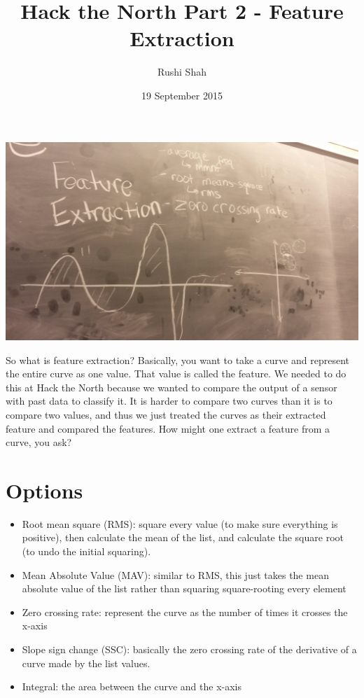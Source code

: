 \documentclass[12pt]{article}
\title{Hack the North Part 2 - Feature Extraction}
\author{Rushi Shah}
\date{19 September 2015}
\begin{document}
  \maketitle

\begin{center}
\includegraphics[width=6in]{feature-vectors}
\end{center}

So what is feature extraction? Basically, you want to take a curve and
represent the entire curve as one value. That value is called the
feature. We needed to do this at Hack the North because we wanted to
compare the output of a sensor with past data to classify it. It is
harder to compare two curves than it is to compare two values, and thus
we just treated the curves as their extracted feature and compared the
features. How might one extract a feature from a curve, you ask?

\section{Options}\label{options}

\begin{itemize}
\item
  Root mean square (RMS): square every value (to make sure everything is
  positive), then calculate the mean of the list, and calculate the
  square root (to undo the initial squaring).
\item
  Mean Absolute Value (MAV): similar to RMS, this just takes the mean
  absolute value of the list rather than squaring square-rooting every
  element
\item
  Zero crossing rate: represent the curve as the number of times it
  crosses the x-axis
\item
  Slope sign change (SSC): basically the zero crossing rate of the
  derivative of a curve made by the list values.
\item
  Integral: the area between the curve and the x-axis
\end{itemize}
\end{document}

